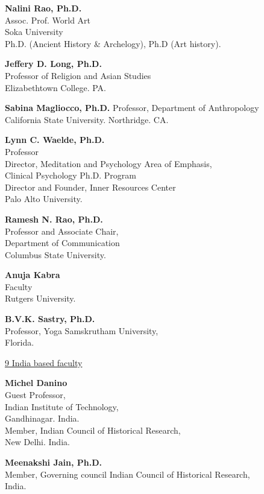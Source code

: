 \textbf{Nalini Rao, Ph.D.}\\ 
Assoc. Prof. World Art\\
Soka University\\
Ph.D. (Ancient History \& Archelogy), Ph.D (Art history).
\medskip
 
\textbf{Jeffery D. Long, Ph.D.}\\ 
Professor of Religion and Asian Studies\\
Elizabethtown College. PA.
\medskip
 
\textbf{Sabina Magliocco, Ph.D.} 
Professor, Department of Anthropology\\
California State University. Northridge. CA. 
\medskip
 
\textbf{Lynn C. Waelde, Ph.D.}\\ 
Professor\\
Director, Meditation and Psychology Area of Emphasis,\\[2pt] 
Clinical Psychology Ph.D. Program\\[2pt]
Director and Founder, Inner Resources Center\\[2pt]
Palo Alto University.
\medskip
 
\textbf{Ramesh N. Rao, Ph.D.}\\ 
Professor and Associate Chair,\\
Department of Communication\\
Columbus State University.
\medskip
 
\textbf{Anuja Kabra}\\ 
Faculty\\
Rutgers University.
\medskip
 
\textbf{B.V.K. Sastry, Ph.D.}\\ 
Professor, Yoga Samskrutham University,\\ 
Florida. 
\medskip

\centerline{\underline{9 India based faculty}} 

\textbf{Michel Danino}\\ 
Guest Professor,\\ 
Indian Institute of Technology,\\ 
Gandhinagar. India.\\
Member, Indian Council of Historical Research,\\ 
New Delhi. India.
\medskip
 

\textbf{Meenakshi Jain, Ph.D.}\\ 
Member, Governing council Indian Council of Historical Research,\\
India.
\medskip
 

